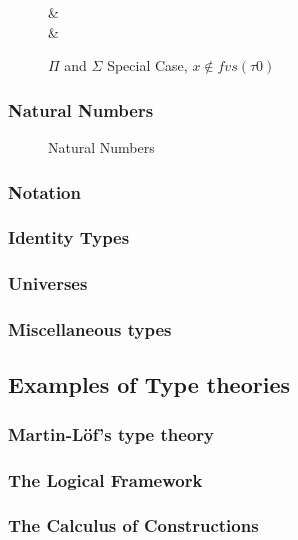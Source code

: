 \documentclass{article}
\begin{document}
\begin{figure}[H]
\centering
\begin{syntax}
\sigma \to \tau &\DefEq {} \tau\\
\sigma \times \tau &\DefEq {} \tau\\
\end{syntax}
\caption{$\Pi$ and $\Sigma$ Special Case, $x \not\in fvs(\tau0)$}
\end{figure}

\subsubsection{Natural Numbers}
\begin{figure}[H]
\centering
\caption{Natural Numbers}
\end{figure}

\subsubsection{Notation}

\subsubsection{Identity Types}

\subsubsection{Universes}

\subsubsection{Miscellaneous types}

\subsection{Examples of Type theories}

\subsubsection{Martin-L\"of's type theory}

\subsubsection{The Logical Framework}

\subsubsection{The Calculus of Constructions}
\end{document}
